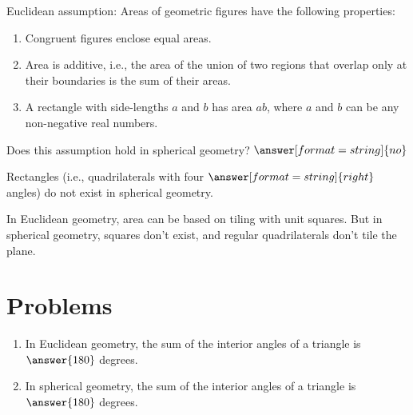 \documentclass{ximera}
\begin{document}
\begin{problem} %
Euclidean assumption:  Areas of geometric figures have the following properties: 
\begin{enumerate}
\item Congruent figures enclose equal areas.
\item Area is additive, i.e., the area of the union of two regions that overlap only at their boundaries is the sum of their areas. 
\item A rectangle with side-lengths $a$ and $b$ has area $ab$, where $a$ and $b$ can be any non-negative real numbers.
\end{enumerate}

Does this assumption hold in spherical geometry? 
$\answer[format=string]{no}$
\begin{problem}
Rectangles (i.e., quadrilaterals with four $\answer[format=string]{right}$ angles) do not exist in spherical geometry.  %

In Euclidean geometry, area can be based on tiling with unit squares.  But in spherical geometry, squares don't exist, and regular quadrilaterals don't tile the plane.
\end{problem}
\end{problem}


\section*{Problems}

\begin{problem}
\begin{enumerate}
\item In Euclidean geometry, the sum of the interior angles of a triangle is 
$\answer{180}$ degrees.
\item In spherical geometry, the sum of the interior angles of a triangle is 
$\answer{180}$ degrees.
\end{enumerate}
\end{problem}
\end{document}
